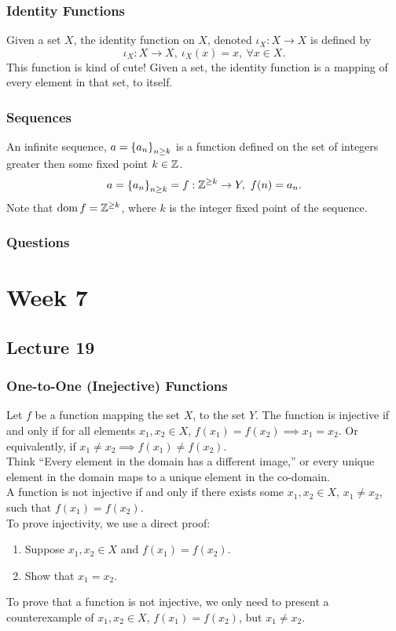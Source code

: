 \documentclass{report}
\begin{document}
\subsection*{Identity Functions}
Given a set $X$, the identity function on $X$, denoted $\iota_X:X\to X$ is defined by
$$
	\iota_X: X\to X,\ \iota_X(x) = x,\ \forall x\in X.
$$
This function is kind of cute! Given a set, the identity function is a mapping of every element in that set, to itself.

\subsection*{Sequences}
An infinite sequence, $a = \left\lbrace a_n \right\rbrace_{n\geq k}$ is a function defined on the set of integers greater then some fixed point $k\in\mathbb{Z}$.
$$
	a = \left\lbrace a_n \right\rbrace_{n\geq k} = f:\mathbb{Z}^{\geq k}\to Y,\ f(n) = a_n. 
$$
Note that $\operatorname{dom} f = \mathbb{Z}^{\geq k}$, where $k$ is the integer fixed point of the sequence.

\subsection*{Questions}
\qs{}{}

\chapter{Week 7}
\section{Lecture 19}
\subsection*{One-to-One (Inejective) Functions}
Let $f$ be a function mapping the set $X$, to the set $Y$. The function is injective if and only if for all elements $x_1, x_2\in X$, $f(x_1) = f(x_2) \implies x_1 = x_2$. Or equivalently, if $x_1 \neq x_2 \implies f(x_1)\neq f(x_2)$. \\

Think ``Every element in the domain has a different image,'' or every unique element in the domain maps to a unique element in the co-domain. \\

A function is not injective if and only if there exists some $x_1, x_2\in X$, $x_1\neq x_2$, such that $f(x_1) = f(x_2)$. \\

To prove injectivity, we use a direct proof:
\begin{enumerate}
	\item Suppose $x_1,x_2\in X$ and $f(x_1) = f(x_2)$.
	\item Show that $x_1 = x_2$.
\end{enumerate}
To prove that a function is not injective, we only need to present a counterexample of $x_1,x_2\in X$, $f(x_1)=f(x_2)$, but $x_1 \neq x_2$.
\end{document}
